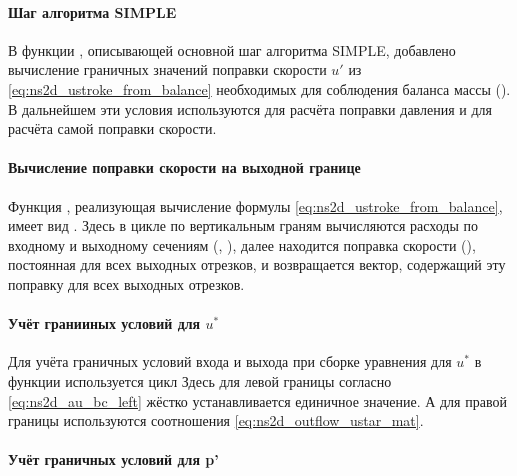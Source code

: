 \paragraph{Шаг алгоритма SIMPLE}
В функции , описывающей основной шаг алгоритма SIMPLE,
добавлено вычисление граничных значений поправки скорости $u'$ из \cref{eq:ns2d_ustroke_from_balance}
необходимых для соблюдения баланса массы ().
В дальнейшем эти условия используются для расчёта поправки давления
и для расчёта самой поправки скорости. 

\paragraph{Вычисление поправки скорости на выходной границе}
Функция , реализующая вычисление формулы \cref{eq:ns2d_ustroke_from_balance},
имеет вид
.
Здесь в цикле по вертикальным граням вычисляются расходы по входному и выходному сечениям
(, ),
далее находится поправка скорости (), постоянная для всех выходных отрезков,
и возвращается вектор, содержащий эту поправку для всех выходных отрезков.

\paragraph{Учёт гранииных условий для $u^*$}
Для учёта граничных условий входа и выхода при сборке уравнения для $u^*$ в функции 
используется цикл
Здесь для левой границы
согласно \cref{eq:ns2d_au_bc_left}
жёстко устанавливается единичное значение.
А для правой границы используются соотношения \cref{eq:ns2d_outflow_ustar_mat}.

\paragraph{Учёт граничных условий для p'}

